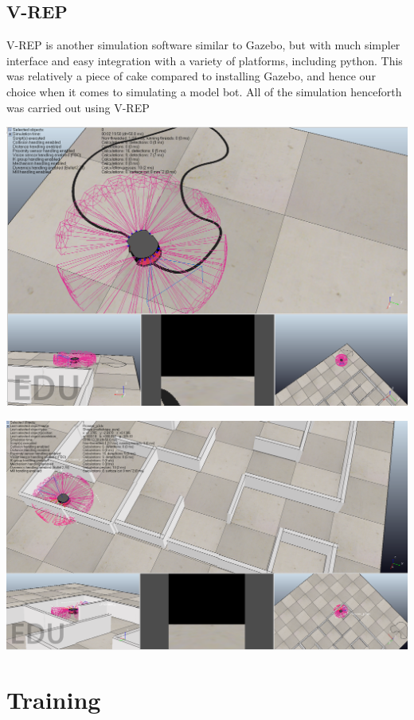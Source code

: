 \documentclass[12pt]{extreport}
\theoremstyle{plain}
\theoremstyle{definition}
\begin{document}
\subsection{V-REP}
V-REP \cite{v-rep} is another simulation software similar to Gazebo, but with much simpler interface and easy integration with a variety of platforms, including python. This was relatively a piece of cake compared to installing Gazebo, and hence our choice when it comes to simulating a model bot. All of the simulation henceforth was carried out using V-REP

\begin{center}
    \includegraphics[width=0.8\linewidth]{2.png}
\end{center}

\begin{center}
    \includegraphics[width=0.8\linewidth]{3.png}
\end{center}

\section{Training}
\end{document}

